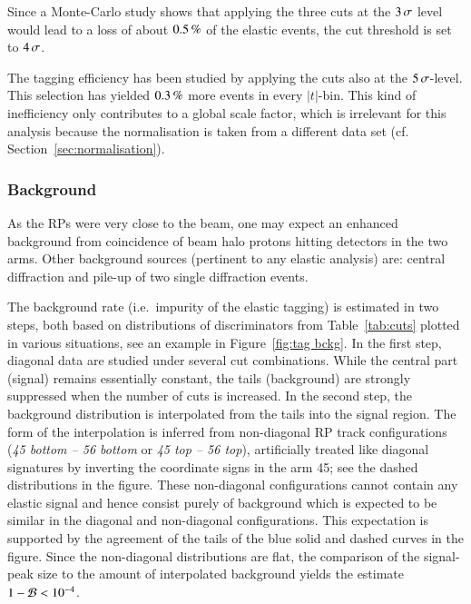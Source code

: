 Since a Monte-Carlo study shows that applying the three cuts at the $3\,{\rm \sigma}$ level would lead to a loss of about $0.5\,{\rm \%}$ of the elastic events, the cut threshold is set to $4\,{\rm \sigma}$.

The tagging efficiency has been studied by applying the cuts also at the $5\,{\rm \sigma}$-level. This selection has yielded $0.3\,{\rm \%}$ more events in every $|t|$-bin. This kind of inefficiency only contributes to a global scale factor, which is irrelevant for this analysis because the normalisation is taken from a different data set (cf. Section~\ref{sec:normalisation}).



\subsubsection{Background}
\label{sec:background}

As the RPs were very close to the beam, one may expect an enhanced background from coincidence of beam halo protons hitting detectors in the two arms. Other background sources (pertinent to any elastic analysis) are: central diffraction and pile-up of two single diffraction events.

The background rate (i.e.~impurity of the elastic tagging) is estimated in two steps, both based on distributions of discriminators from Table~\ref{tab:cuts} plotted in various situations, see an example in Figure~\ref{fig:tag bckg}. In the first step, diagonal data are studied under several cut combinations. While the central part (signal) remains essentially constant, the tails (background) are strongly suppressed when the number of cuts is increased. In the second step, the background distribution is interpolated from the tails into the signal region. The form of the interpolation is inferred from non-diagonal RP track configurations (\textit{45 bottom -- 56 bottom} or \textit{45 top -- 56 top}), artificially treated like diagonal signatures by inverting the coordinate signs in the arm 45; see the dashed distributions in the figure. These non-diagonal configurations cannot contain any elastic signal and hence consist purely of background which is expected to be similar in the diagonal and non-diagonal configurations. This expectation is supported by the agreement of the tails of the blue solid and dashed curves in the figure. Since the non-diagonal distributions are flat, the comparison of the signal-peak size to the amount of interpolated background yields the estimate $1 - {\cal B} < 10^{-4}$.


